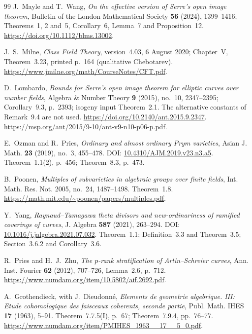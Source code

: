 \documentclass[11pt,a4paper]{article}
\begin{document}
\begin{thebibliography}{99}
J.~Mayle and T.~Wang, \emph{On the effective version of Serre's
open image theorem}, Bulletin of the London Mathematical Society
\textbf{56} (2024), 1399--1416; Theorems~1, 2 and~5,
Corollary~6, Lemma~7 and Proposition~12.
\url{https://doi.org/10.1112/blms.13002}.

J.~S.~Milne, \emph{Class Field Theory}, version~4.03,
6 August 2020; Chapter~V, Theorem~3.23, printed p.~164
(qualitative Chebotarev).
\url{https://www.jmilne.org/math/CourseNotes/CFT.pdf}.

D.~Lombardo, \emph{Bounds for Serre's open image theorem for elliptic
curves over number fields}, Algebra \& Number Theory \textbf{9}
(2015), no.~10, 2347--2395; Corollary~9.3, p.~2393;
isogeny input Theorem~2.1. The alternative constants of Remark~9.4
are not used.
\url{https://doi.org/10.2140/ant.2015.9.2347}.
\url{https://msp.org/ant/2015/9-10/ant-v9-n10-p06-p.pdf}.

E.~Ozman and R.~Pries,
\emph{Ordinary and almost ordinary Prym varieties},
Asian J. Math. \textbf{23} (2019), no.~3, 455--478.
DOI: \href{https://doi.org/10.4310/AJM.2019.v23.n3.a5}{10.4310/AJM.2019.v23.n3.a5}.
Theorem~1.1(2), p.~456; Theorem~8.3, p.~473.

B.~Poonen,
\emph{Multiples of subvarieties in algebraic groups over finite fields},
Int. Math. Res. Not. 2005, no.~24, 1487--1498.
Theorem~1.8.
\url{https://math.mit.edu/~poonen/papers/multiples.pdf}.

Y.~Yang,
\emph{Raynaud--Tamagawa theta divisors and new-ordinariness of
ramified coverings of curves},
J. Algebra \textbf{587} (2021), 263--294.
DOI: \href{https://doi.org/10.1016/j.jalgebra.2021.07.032}{10.1016/j.jalgebra.2021.07.032}.
Theorem~1.1; Definition~3.3 and Theorem~3.5;
Section~3.6.2 and Corollary~3.6.

R.~Pries and H.~J.~Zhu, \emph{The $p$-rank stratification of
Artin--Schreier curves}, Ann. Inst. Fourier \textbf{62} (2012),
707--726, Lemma~2.6, p.~712.
\url{https://www.numdam.org/item/10.5802/aif.2692.pdf}.

A.~Grothendieck, with J.~Dieudonn\'e, \emph{Elements de geometrie
algebrique. III: Etude cohomologique des faisceaux coherents,
seconde partie}, Publ. Math. IHES \textbf{17} (1963), 5--91.
Theorem~7.7.5(I), p.~67; Theorem~7.9.4, pp.~76--77.
\url{https://www.numdam.org/item/PMIHES_1963__17__5_0.pdf}.


\end{thebibliography}
\end{document}
